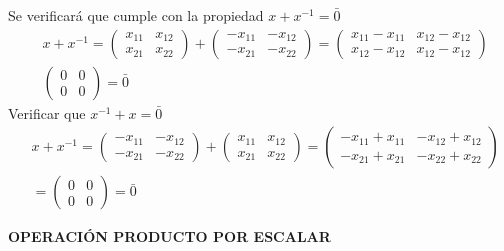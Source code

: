 \begin{exercise}[Sea $x\in M_{2\times 2}(\R)x^{-1}$ denotado así el inverso aditivo, tal que $x^{-1}\in M_{2\times 2}(\R)$ que cumple con la propiedad de que: $x+x^{-1}=\bar{0}$]
	Se verificará que cumple con la propiedad $x+x^{-1}=\bar{0}$
	\begin{align*}
		 & x+x^{-1}=\begin{pmatrix}
			            x_{11} & x_{12} \\x_{21}&x_{22}
		            \end{pmatrix}+\begin{pmatrix}
			                          -x_{11} & -x_{12} \\-x_{21}&-x_{22}
		                          \end{pmatrix}= \begin{pmatrix}
			                                         x_{11}-x_{11} & x_{12}-x_{12} \\x_{12}-x_{12}&x_{12}-x_{12}
		                                         \end{pmatrix} \\
		 & \begin{pmatrix}
			   0 & 0 \\0&0
		   \end{pmatrix}=\bar{0}
	\end{align*}
	Verificar que $x^{-1}+x=\bar{0}$
	\begin{align*}
		 & x+x^{-1}=\begin{pmatrix}
			            -x_{11} & -x_{12} \\-x_{21}&-x_{22}
		            \end{pmatrix}+\begin{pmatrix}
			                          x_{11} & x_{12} \\x_{21}&x_{22}
		                          \end{pmatrix}=\begin{pmatrix}
			                                        -x_{11}+x_{11} & -x_{12}+x_{12} \\-x_{21}+x_{21}&-x_{22}+x_{22}
		                                        \end{pmatrix} \\
		 & =\begin{pmatrix}
			    0 & 0 \\0&0
		    \end{pmatrix}=\bar{0}
	\end{align*}
\end{exercise}



\textbf{OPERACIÓN PRODUCTO POR ESCALAR}


